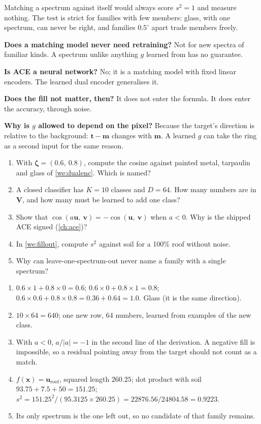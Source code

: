 \documentclass[11pt,a4paper,oneside,openany]{book}
\newcommand{\B}[1]{{\symbf{#1}}}
\newcommand{\B}[1]{{\bm{#1}}}
\newcommand{\vx}{\B{x}}
\newcommand{\vt}{\B{t}}
\newcommand{\vu}{\B{u}}
\newcommand{\vv}{\B{v}}
\newcommand{\vm}{\B{m}}
\newcommand{\vzeta}{\B{\zeta}}
\begin{document}
Matching a spectrum against itself would always score $s^2=1$ and measure nothing. The test is strict for families with few members: glass, with one spectrum, can
never be right, and families $0.5^\circ$ apart trade members freely.

\begin{confusions}
\textbf{Does a matching model never need retraining?} Not for new spectra of familiar kinds. A spectrum unlike anything $g$ learned from has no guarantee.

\textbf{Is ACE a neural network?} No; it is a matching model with fixed linear encoders. The learned dual encoder generalises it.

\textbf{Does the fill not matter, then?} It does not enter the formula. It does enter the accuracy, through noise.

\textbf{Why is $g$ allowed to depend on the pixel?} Because the target's direction is relative to the background: $\vt-\vm$ changes with $\vm$. A learned $g$ can take
the ring as a second input for the same reason.
\end{confusions}

\begin{checkyourself}
\begin{enumerate}
\item With $\vzeta=(0.6,\ 0.8)$, compute the cosine against painted metal, tarpaulin and glass of \cref{we:dualenc}. Which is named?
\item A closed classifier has $K=10$ classes and $D=64$. How many numbers are in $\B{V}$, and how many must be learned to add one class?
\item Show that $\cos(a\vu,\ \vv)=-\cos(\vu,\ \vv)$ when $a<0$. Why is the shipped ACE signed (\cref{ch:ace})?
\item In \cref{we:fillout}, compute $s^2$ against soil for a 100\% roof without noise.
\item Why can leave-one-spectrum-out never name a family with a single spectrum?
\end{enumerate}
\end{checkyourself}

\begin{answers}
\begin{enumerate}
\item $0.6\times1+0.8\times0=0.6$; $0.6\times0+0.8\times1=0.8$; $0.6\times0.6+0.8\times0.8=0.36+0.64=1.0$. Glass (it is the same direction).
\item $10\times64=640$; one new row, 64 numbers, learned from examples of the new class.
\item With $a<0$, $a/|a|=-1$ in the second line of the derivation. A negative fill is impossible, so a residual pointing away from the target should not count as a match.
\item $f(\vx)=\vu_{\text{roof}}$, squared length $260.25$; dot product with soil $93.75+7.5+50=151.25$; $s^2=151.25^2/(95.3125\times260.25)=22876.56/24804.58=0.9223$.
\item Its only spectrum is the one left out, so no candidate of that family remains.
\end{enumerate}
\end{answers}
\end{document}
